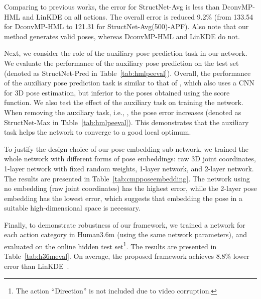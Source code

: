 \documentclass[10pt,twocolumn,letterpaper]{article}
\begin{document}
Comparing to previous works, the error for StructNet-Avg is less than
DconvMP-HML \cite{accv2014} and LinKDE \cite{h36m_pami} on all actions.  The overall error is reduced 9.2\% (from 133.54 for DconvMP-HML to 121.31 for StructNet-Avg(500)-APF).
Also note that our method generates valid poses, whereas DconvMP-HML and LinKDE do not.

 

Next, we consider the role of the auxiliary pose prediction task in our network.  
We evaluate the performance of the auxiliary pose prediction on the test set (denoted as StructNet-Pred in Table~\ref{tab:hmlpeeval}).    
Overall, the performance of the auxiliary pose prediction task is similar to that of \cite{accv2014},
which also uses a CNN for 3D pose estimation, but inferior to the poses obtained using the score function. 
We also test the effect of the auxiliary task on training the network.
When removing the auxiliary task, i.e., , the pose error increases  (denoted as StructNet-Max in Table~\ref{tab:hmlpeeval}).  This demonstrates that the auxiliary task helps the network to converge to a good local optimum.

To justify the design choice of our pose embedding sub-network, we trained the whole network with different forms of pose embeddings: raw 3D joint coordinates, 1-layer network with fixed random weights, 1-layer network, and 2-layer network.  The results are presented in Table~\ref{tab:cmpposeembedding}. The network using no embedding (raw joint coordinates) has the highest error, while the 2-layer pose embedding has the lowest error, which suggests that embedding the pose in a suitable high-dimensional space is necessary.





Finally, to demonstrate robustness of our framework, we trained a network for each action category in Human3.6m (using the same network parameters), and evaluated on the online hidden test set\footnote{The action ``Direction'' is not included due to video corruption.}.
The results are presented in Table~\ref{tab:h36meval}. On average, the proposed framework achieves 8.8\% lower error than LinKDE~\cite{h36m_pami}.
 
\end{document}
